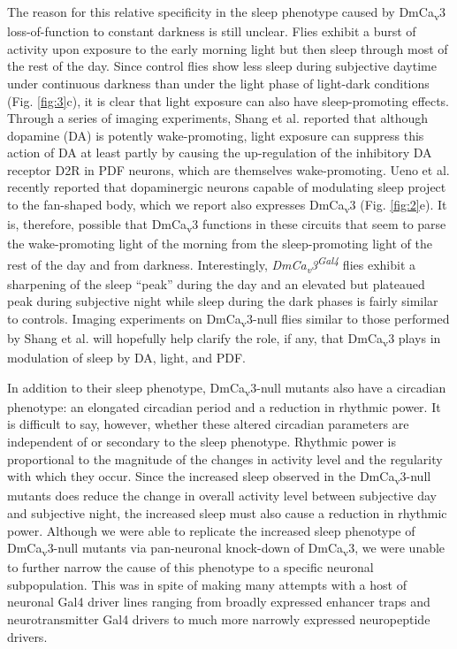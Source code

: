The reason for this relative specificity in the sleep phenotype caused by DmCa\textsubscript{v}3 loss-of-function to constant darkness is still unclear.
Flies exhibit a burst of activity upon exposure to the early morning light but then sleep through most of the rest of the day.
Since control flies show less sleep during subjective daytime under continuous darkness than under the light phase of light-dark conditions (Fig. \ref{fig:3}c), it is clear that light exposure can also have sleep-promoting effects.
Through a series of imaging experiments, Shang et al. reported that although dopamine (DA) is potently wake-promoting, light exposure can suppress this action of DA at least partly by causing the up-regulation of the inhibitory DA receptor D2R in PDF neurons, which are themselves wake-promoting\cite{shang:2011aa}.
Ueno et al. recently reported that dopaminergic neurons capable of modulating sleep project to the fan-shaped body\cite{ueno:2012aa}, which we report also expresses DmCa\textsubscript{v}3 (Fig. \ref{fig:2}e).
It is, therefore, possible that DmCa\textsubscript{v}3 functions in these circuits that seem to parse the wake-promoting light of the morning from the sleep-promoting light of the rest of the day and from darkness.
Interestingly, \emph{DmCa\textsubscript{v}3\textsuperscript{Gal4}} flies exhibit a sharpening of the sleep ``peak'' during the day and an elevated but plateaued peak during subjective night while sleep during the dark phases is fairly similar to controls.
Imaging experiments on DmCa\textsubscript{v}3-null flies similar to those performed by Shang et al. will hopefully help clarify the role, if any, that DmCa\textsubscript{v}3 plays in modulation of sleep by DA, light, and PDF. 

In addition to their sleep phenotype, DmCa\textsubscript{v}3-null mutants also have a circadian phenotype: an elongated circadian period and a reduction in rhythmic power.
It is difficult to say, however, whether these altered circadian parameters are independent of or secondary to the sleep phenotype.
Rhythmic power is proportional to the magnitude of the changes in activity level and the regularity with which they occur.
Since the increased sleep observed in the DmCa\textsubscript{v}3-null mutants does reduce the change in overall activity level between subjective day and subjective night, the increased sleep must also cause a reduction in rhythmic power.
Although we were able to replicate the increased sleep phenotype of DmCa\textsubscript{v}3-null mutants via pan-neuronal knock-down of DmCa\textsubscript{v}3, we were unable to further narrow the cause of this phenotype to a specific neuronal subpopulation.
This was in spite of making many attempts with a host of neuronal Gal4 driver lines ranging from broadly expressed enhancer traps and neurotransmitter Gal4 drivers to much more narrowly expressed neuropeptide drivers.

